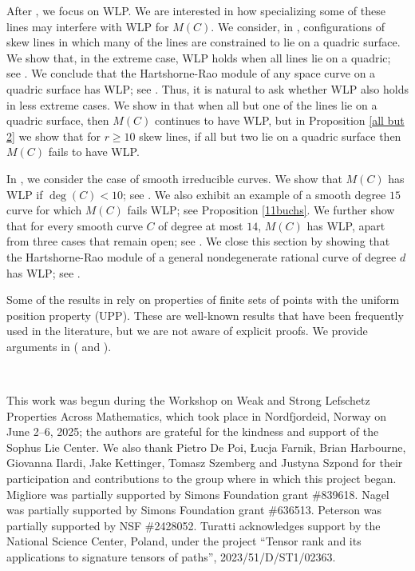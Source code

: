 \documentclass[12pt]{amsart}%
\numberwithin{equation}{section}
\theoremstyle{definition}
\numberwithin{equation}{section}
\begin{document}
{After , we focus on WLP. We are interested in how specializing some of these lines may interfere with WLP for $M(C)$.  We consider, in , configurations of skew lines in which many of the lines are constrained to lie on a quadric surface. We show that, in the extreme case, WLP holds when all lines lie on a quadric; see . We conclude that the Hartshorne-Rao module of any space curve on a quadric surface has WLP; see . Thus, it is natural to ask whether WLP also holds in less extreme cases. We show in  that when all but one of the lines lie on a quadric surface, then $M(C)$ continues to have WLP, but in Proposition \ref{all but 2}  we show that for $r \geq 10$ skew lines, if all but two lie on a quadric surface then $M(C)$ fails to have WLP.

In , we consider the case of smooth irreducible curves. We show that $M(C)$ has WLP if $\deg(C)< 10$; see . We also exhibit an example of a smooth degree $15$ curve for which $M(C)$ fails WLP; see Proposition \ref{11buchs}. We further show that for every smooth curve $C$  of degree at most $14$, $M(C)$ has WLP, apart from three cases that remain open; see . We close this section by showing that the Hartshorne-Rao module of a general nondegenerate rational curve of degree $d$ has WLP; see . 
}

Some of the results in  rely on properties of finite sets of points with the uniform position property (UPP). These are well-known results that have been frequently used in the literature, but we are not aware of explicit proofs. We provide arguments in  ( and ). 

\

 This work was begun during the Workshop on Weak and Strong Lefschetz Properties Across Mathematics, which  took place in Nordfjordeid, Norway on June 2--6, 2025; the  authors are grateful for the kindness and support of the Sophus Lie Center. We also thank Pietro De Poi, {\L}ucja Farnik, Brian Harbourne, Giovanna Ilardi, Jake Kettinger, Tomasz Szemberg and Justyna Szpond for their participation and contributions to the group where in which this project began.
Migliore was partially supported by Simons Foundation grant \#839618. Nagel was partially supported by Simons Foundation grant \#636513. Peterson was partially supported by NSF \#2428052. Turatti acknowledges support by the National Science Center, Poland, under the project “Tensor rank and its applications to signature tensors of paths”, 2023/51/D/ST1/02363.
\end{document}
